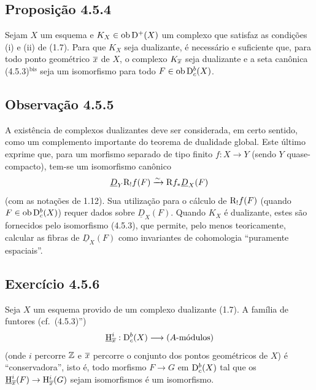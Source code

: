 \subsection*{Proposição 4.5.4}
Sejam $X$ um esquema e $K_X\in\operatorname{ob}\mathrm{D}^+(X)$ um complexo que satisfaz as condições (i) e (ii) de (1.7). Para que $K_X$ seja dualizante, é necessário e suficiente que, para todo ponto geométrico $\overline{x}$ de $X$, o complexo $K_{\overline{x}}$ seja dualizante e a seta canônica (4.5.3)$^{\mathrm{bis}}$ seja um isomorfismo para todo $F\in\operatorname{ob}\mathrm{D}_c^b(X)$.

\subsection*{Observação 4.5.5}
A existência de complexos dualizantes deve ser considerada, em certo sentido, como um complemento importante do teorema de dualidade global. Este último exprime que, para um morfismo separado de tipo finito $f:X\to Y$ (sendo $Y$ quase-compacto), tem-se um isomorfismo canônico
\[
\underline{D}_Y\mathrm{R}_!f(F)\xrightarrow{\sim}\mathrm{R} f_*\underline{D}_X(F)
\]
(com as notações de 1.12). Sua utilização para o cálculo de $\mathrm{R}_!f(F)$ (quando $F\in\operatorname{ob}\mathrm{D}_c^b(X)$) requer dados sobre $\underline{D}_X(F)$. Quando $K_X$ é dualizante, estes são fornecidos pelo isomorfismo (4.5.3), que permite, pelo menos teoricamente, calcular as fibras de $\underline{D}_X(F)$ como invariantes de cohomologia ``puramente espaciais''.

\subsection*{Exercício 4.5.6}
Seja $X$ um esquema provido de um complexo dualizante (1.7). A família de funtores (cf.~(4.5.3)'')
\[
\underline{\mathrm{H}}_{\overline{x}}^i:\mathrm{D}_c^b(X)\longrightarrow (A\text{-módulos})
\]
(onde $i$ percorre $\mathbb{Z}$ e $\overline{x}$ percorre o conjunto dos pontos geométricos de $X$) é ``conservadora'', isto é, todo morfismo $F\to G$ em $\mathrm{D}_c^b(X)$ tal que os $\underline{\mathrm H}_{\overline{x}}^i(F)\to\mathrm{H}_{\overline{x}}^i(G)$ sejam isomorfismos é um isomorfismo.
